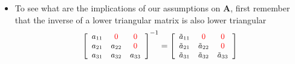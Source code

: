 \documentclass[10pt,handout]{beamer}
\begin{document}
\vspace{0.1cm}

\begin{frame}
\begin{itemize}
\item To see what are the implications of our assumptions on $\mathbf{A}$,
first remember that the inverse of a lower triangular matrix is also lower
triangular%
\begin{equation*}
{\small \left[ 
\begin{array}{ccc}
a_{11} & {%
\color{red}%
{0}} & {%
\color{red}%
{0}} \\ 
a_{21} & a_{22} & {%
\color{red}%
{0}} \\ 
a_{31} & a_{32} & a_{33}%
\end{array}%
\right] ^{-1}=\left[ 
\begin{array}{ccc}
\tilde{a}_{11} & {%
\color{red}%
{0}} & {%
\color{red}%
{0}} \\ 
\tilde{a}_{21} & \tilde{a}_{22} & {%
\color{red}%
{0}} \\ 
\tilde{a}_{31} & \tilde{a}_{32} & \tilde{a}_{33}%
\end{array}%
\right]}
\end{equation*}


\end{itemize}
\end{frame}
\end{document}
